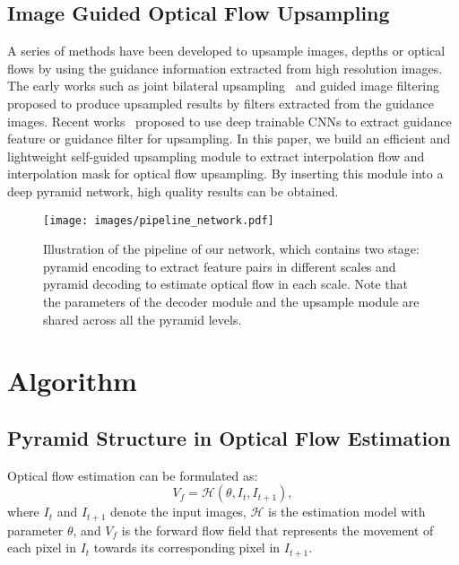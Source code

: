 \documentclass[final]{cvpr}
\begin{document}
\subsection{Image Guided Optical Flow Upsampling} \label{sec:related_image_guided_upsample}
A series of methods have been developed to upsample images, depths or optical flows by using the guidance information extracted from high resolution images. The early works such as joint bilateral upsampling~\cite{kopf2007JBU} and guided image filtering~\cite{he2010guided} proposed to produce upsampled results by filters extracted from the guidance images. Recent works~\cite{li2016fastfgi,wu2018fast,su2019pac} proposed to use deep trainable CNNs to extract guidance feature or guidance filter for upsampling. In this paper, we build an efficient and lightweight self-guided upsampling module to extract interpolation flow and interpolation mask for optical flow upsampling. By inserting this module into a deep pyramid network, high quality results can be obtained. 

\begin{figure*}
	\centering
	\texttt{[image: images/pipeline\_network.pdf]}
	\caption{Illustration of the pipeline of our network, which contains two stage: pyramid encoding to extract feature pairs in different scales and pyramid decoding to estimate optical flow in each scale. Note that the parameters of the decoder module and the upsample module are shared across all the pyramid levels. }\label{fig:algo_our_pipeline}
\end{figure*}

\section{Algorithm}\label{sec:algo}
\subsection{Pyramid Structure in Optical Flow Estimation}\label{sec:algo_pyramid_structure}
Optical flow estimation can be formulated as: 
\begin{equation}\label{eq:optical_flow_model}
	V_{f}=\mathcal{H}(\theta,I_{t},I_{t+1}), 
\end{equation}
where $I_{t}$ and $I_{t+1}$ denote the input images, $\mathcal{H}$ is the estimation model with parameter $\theta$, and $V_{f}$ is the forward flow field that represents the movement of each pixel in $I_t$ towards its corresponding pixel in $I_{t+1}$. 
\end{document}
